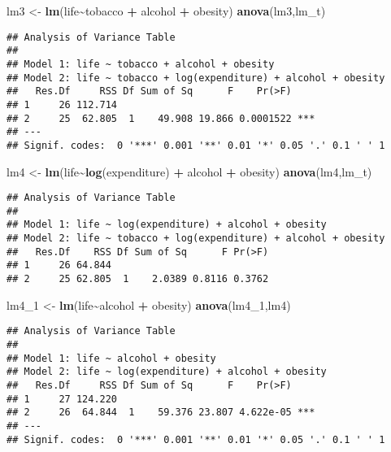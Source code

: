 \documentclass[
]{article}
\newenvironment{Shaded}{\begin{snugshade}}{\end{snugshade}}
\newcommand{\FunctionTok}[1]{\textcolor[rgb]{0.13,0.29,0.53}{\textbf{#1}}}
\newcommand{\NormalTok}[1]{#1}
\newcommand{\OtherTok}[1]{\textcolor[rgb]{0.56,0.35,0.01}{#1}}
\newcommand{\SpecialCharTok}[1]{\textcolor[rgb]{0.81,0.36,0.00}{\textbf{#1}}}
\begin{document}
\begin{Shaded}
\begin{Highlighting}[]
\NormalTok{lm3 }\OtherTok{\textless{}{-}} \FunctionTok{lm}\NormalTok{(life}\SpecialCharTok{\textasciitilde{}}\NormalTok{tobacco }\SpecialCharTok{+}\NormalTok{ alcohol }\SpecialCharTok{+}\NormalTok{ obesity)}
\FunctionTok{anova}\NormalTok{(lm3,lm\_t)}
\end{Highlighting}
\end{Shaded}

\begin{verbatim}
## Analysis of Variance Table
## 
## Model 1: life ~ tobacco + alcohol + obesity
## Model 2: life ~ tobacco + log(expenditure) + alcohol + obesity
##   Res.Df     RSS Df Sum of Sq      F    Pr(>F)    
## 1     26 112.714                                  
## 2     25  62.805  1    49.908 19.866 0.0001522 ***
## ---
## Signif. codes:  0 '***' 0.001 '**' 0.01 '*' 0.05 '.' 0.1 ' ' 1
\end{verbatim}

\begin{Shaded}
\begin{Highlighting}[]
\NormalTok{lm4 }\OtherTok{\textless{}{-}} \FunctionTok{lm}\NormalTok{(life}\SpecialCharTok{\textasciitilde{}}\FunctionTok{log}\NormalTok{(expenditure) }\SpecialCharTok{+}\NormalTok{ alcohol }\SpecialCharTok{+}\NormalTok{ obesity)}
\FunctionTok{anova}\NormalTok{(lm4,lm\_t)}
\end{Highlighting}
\end{Shaded}

\begin{verbatim}
## Analysis of Variance Table
## 
## Model 1: life ~ log(expenditure) + alcohol + obesity
## Model 2: life ~ tobacco + log(expenditure) + alcohol + obesity
##   Res.Df    RSS Df Sum of Sq      F Pr(>F)
## 1     26 64.844                           
## 2     25 62.805  1    2.0389 0.8116 0.3762
\end{verbatim}

\begin{Shaded}
\begin{Highlighting}[]
\NormalTok{lm4\_1 }\OtherTok{\textless{}{-}} \FunctionTok{lm}\NormalTok{(life}\SpecialCharTok{\textasciitilde{}}\NormalTok{alcohol }\SpecialCharTok{+}\NormalTok{ obesity)}
\FunctionTok{anova}\NormalTok{(lm4\_1,lm4)}
\end{Highlighting}
\end{Shaded}

\begin{verbatim}
## Analysis of Variance Table
## 
## Model 1: life ~ alcohol + obesity
## Model 2: life ~ log(expenditure) + alcohol + obesity
##   Res.Df     RSS Df Sum of Sq      F    Pr(>F)    
## 1     27 124.220                                  
## 2     26  64.844  1    59.376 23.807 4.622e-05 ***
## ---
## Signif. codes:  0 '***' 0.001 '**' 0.01 '*' 0.05 '.' 0.1 ' ' 1
\end{verbatim}
\end{document}
